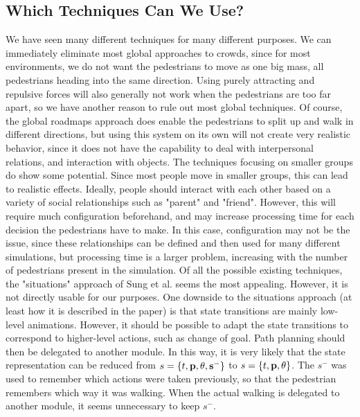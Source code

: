 \documentclass[11pt]{book}
\begin{document}
\subsection{Which Techniques Can We Use?}
We have seen many different techniques for many different purposes. We can immediately eliminate most global approaches to  crowds, since for most environments, we do not want the pedestrians to move as one big mass, all pedestrians heading into the same direction. Using purely attracting and repulsive forces will also generally not work when the pedestrians are too far apart, so we have another reason to rule out most global techniques. Of course, the global roadmaps approach does enable the pedestrians to split up and walk in different directions, but using this system on its own will not create very realistic behavior, since it does not have the capability to deal with interpersonal relations, and interaction with objects.
The techniques focusing on smaller groups do show some potential. Since most people move in smaller groups, this can lead to realistic effects. Ideally, people should interact with each other based on a variety of social relationships such as "parent" and "friend". However, this will require much configuration beforehand, and may increase processing time for each decision the pedestrians have to make. In this case, configuration may not be the issue, since these relationships can be defined and then used for many different simulations, but processing time is a larger problem, increasing with the number of pedestrians present in the simulation.
Of all the possible existing techniques, the "situations" approach of Sung et al. seems the most appealing. However, it is not directly usable for our purposes. One downside to the situations approach (at least how it is described in the paper) is that state transitions are mainly low-level animations. However, it should be possible to adapt the state transitions to correspond to higher-level actions, such as change of goal. Path planning should then be delegated to another module. In this way, it is very likely that the state representation can be reduced from $s = \{t, \bf{p}, \theta, s^- \}$ to $s = \{t, \bf{p}, \theta\}$. The $s^-$ was used to remember which actions were taken previously, so that the pedestrian remembers which way it was walking. When the actual walking is delegated to another module, it seems unnecessary to keep $s^-$.
\end{document}
